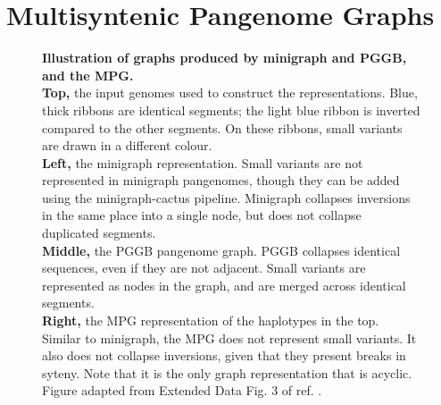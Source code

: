 


\section*{Multisyntenic Pangenome Graphs}

\begin{figure}[t]
	\centering
	
	\caption{
		\textbf{Illustration of graphs produced by minigraph and PGGB, and the MPG.}\\
		\textbf{Top,} the input genomes used to construct the representations.
		Blue, thick ribbons are identical segments; the light blue ribbon is inverted compared to the other segments.
		On these ribbons, small variants are drawn in a different colour.\\
		\textbf{Left,} the minigraph representation.
		Small variants are not represented in minigraph pangenomes, though they can be added using the minigraph-cactus pipeline.
		Minigraph collapses inversions in the same place into a single node, but does not collapse duplicated segments.\\
		\textbf{Middle,} the PGGB pangenome graph.
		PGGB collapses identical sequences, even if they are not adjacent.
		Small variants are represented as nodes in the graph, and are merged across identical segments.
		\\
		\textbf{Right,} the MPG representation of the haplotypes in the top.
		Similar to minigraph, the MPG does not represent small variants.
		It also does not collapse inversions, given that they present breaks in syteny.
		Note that it is the only graph representation that is acyclic.\\
		Figure adapted from Extended Data Fig. 3 of ref. \cite{liao23}.
	}
\label{fig:mpgcompare}
\end{figure}

